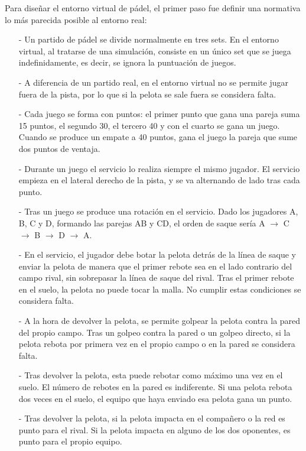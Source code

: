 Para diseñar el entorno virtual de pádel, el primer paso fue definir una normativa lo más parecida posible al entorno real:
\begin{enumerate}
    \item[-] Un partido de pádel se divide normalmente en tres sets. En el entorno virtual, al tratarse de una simulación, consiste en un único set que se juega indefinidamente, es decir, se ignora la puntuación de juegos.
    \item[-] A diferencia de un partido real, en el entorno virtual no se permite jugar fuera de la pista, por lo que si la pelota se sale fuera se considera falta.
    \item[-] Cada juego se forma con puntos: el primer punto que gana una pareja suma 15 puntos, el segundo 30, el tercero 40 y con el cuarto se gana un juego. Cuando se produce un empate a 40 puntos, gana el juego la pareja que sume dos puntos de ventaja.
    \item[-] Durante un juego el servicio lo realiza siempre el mismo jugador. El servicio empieza en el lateral derecho de la pista, y se va alternando de lado tras cada punto.
    \item[-] Tras un juego se produce una rotación en el servicio. Dado los jugadores A, B, C y D, formando las parejas AB y CD, el orden de saque sería A $\rightarrow$ C $\rightarrow$ B $\rightarrow$ D $\rightarrow$ A.
    \item[-] En el servicio, el jugador debe botar la pelota detrás de la línea de saque y enviar la pelota de manera que el primer rebote sea en el lado contrario del campo rival, sin sobrepasar la línea de saque del rival. Tras el primer rebote en el suelo, la pelota no puede tocar la malla. No cumplir estas condiciones se considera falta.
    \item[-] A la hora de devolver la pelota, se permite golpear la pelota contra la pared del propio campo. Tras un golpeo contra la pared o un golpeo directo, si la pelota rebota por primera vez en el propio campo o en la pared se considera falta.
    \item[-] Tras devolver la pelota, esta puede rebotar como máximo una vez en el suelo. El número de rebotes en la pared es indiferente. Si una pelota rebota dos veces en el suelo, el equipo que haya enviado esa pelota gana un punto.
    \item[-] Tras devolver la pelota, si la pelota impacta en el compañero o la red es punto para el rival. Si la pelota impacta en alguno de los dos oponentes, es punto para el propio equipo.
\end{enumerate}

